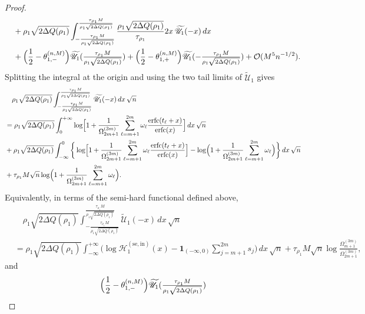 \documentclass[a4paper]{article}
\newcommand{\erfc}{{\rm erfc}}
\numberwithin{equation}{section}
\begin{document}
\begin{proof}
\begin{align*}
&\quad+\rho_1\sqrt{2\Delta Q(\rho_1)}
\int_{-\frac{\tau_{\rho_1}M}{\rho_1\sqrt{2\Delta Q(\rho_1)}}}^{\frac{\tau_{\rho_1}M}{\rho_1\sqrt{2\Delta Q(\rho_1)}}}
\frac{\rho_1\sqrt{2\Delta Q(\rho_1)}}{\tau_{\rho_1}}
2x\,\widetilde{\mathscr{U}}_1(-x)\,dx
\\
&\quad 
+\Bigl(\frac{1}{2}-\theta_{1,-}^{(n,M)}\Bigr)\widetilde{\mathscr{U}}_{1}(\tfrac{\tau_{\rho_1}M}{\rho_1\sqrt{2\Delta Q(\rho_1)}})
+\Bigl(\frac{1}{2}-\theta_{1,+}^{(n,M)}\Bigr)
\widetilde{\mathscr{U}}_{1}(-\tfrac{\tau_{\rho_1}M}{\rho_1\sqrt{2\Delta Q(\rho_1)}})
+\mathcal{O}(M^5n^{-1/2}). 
\end{align*}
Splitting the integral at the origin and using the two tail limits of
$\widetilde{\mathscr U}_1$ gives
\begin{align*}
&\quad\rho_1\sqrt{2\Delta Q(\rho_1)}\int_{-\frac{\tau_{\rho_1}M}{\rho_1\sqrt{2\Delta Q(\rho_1)}}}^{\frac{\tau_{\rho_1}M}{\rho_1\sqrt{2\Delta Q(\rho_1)}}}
\widetilde{\mathscr{U}}_1(-x)\,dx\,\sqrt{n}
\\
&=
\rho_1\sqrt{2\Delta Q(\rho_1)}\int_{0}^{+\infty}
\log\Bigl[1+\frac{1}{\Omega_{2m+1}^{(3m)}}\sum_{\ell=m+1}^{2m}\omega_{\ell}\frac{\erfc(t_{\ell}+x)}{\erfc(x)}
\Bigr]
\,dx\,\sqrt{n}
\\
&
+\rho_1\sqrt{2\Delta Q(\rho_1)}\int_{-\infty}^{0}
\bigg\{
\log\Bigl[1+\frac{1}{\Omega_{2m+1}^{(3m)}}\sum_{\ell=m+1}^{2m}\omega_{\ell}\frac{\erfc(t_{\ell}+x)}{\erfc(x)}
\Bigr]
-\log\Bigl( 
1+\frac{1}{\Omega_{2m+1}^{(3m)}}\sum_{\ell=m+1}^{2m}\omega_{\ell}
\Bigr)
\bigg\}
\,dx\,\sqrt{n}
\\
&
+
\tau_{\rho_1}M\sqrt{n}
\log\Bigl( 
1+\frac{1}{\Omega_{2m+1}^{(3m)}}\sum_{\ell=m+1}^{2m}\omega_{\ell}
\Bigr). 
\end{align*}
Equivalently, in terms of the semi-hard functional defined above,
\begin{align*}
&\quad \rho_1\sqrt{2\Delta Q(\rho_1)}\int_{-\frac{\tau_{\rho_1}M}{\rho_1\sqrt{2\Delta Q(\rho_1)}}}^{\frac{\tau_{\rho_1}M}{\rho_1\sqrt{2\Delta Q(\rho_1)}}}
\widetilde{\mathscr{U}}_1(-x)\,dx\,\sqrt{n}
\\
&=
\rho_1\sqrt{2\Delta Q(\rho_1)}\int_{-\infty}^{+\infty}
\bigg(
\log\mathcal{H}_1^{(\mathrm{se},\mathrm{in})}(x)
-
\mathbf{1}_{(-\infty,0)}
\sum_{j=m+1}^{2m}s_{j}
\bigg)
\,dx\,\sqrt{n}
+
\tau_{\rho_1}M\sqrt{n}
\log\frac{\Omega_{m+1}^{(3m)}}{\Omega_{2m+1}^{(3m)}},
\end{align*}
and 
\begin{align*}
&\quad \Bigl(\frac{1}{2}-\theta_{1,-}^{(n,M)}\Bigr)\widetilde{\mathscr{U}}_{1}(\tfrac{\tau_{\rho_1}M}{\rho_1\sqrt{2\Delta Q(\rho_1)}})

\end{align*}
\end{proof}
\end{document}
